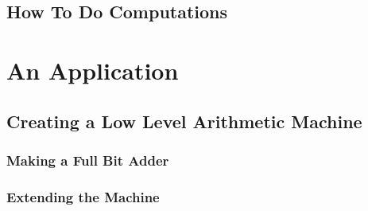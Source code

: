 \documentclass[UTF8]{article}
\begin{document}
    \subsection{How To Do Computations}

  \newpage

  \section{An Application}
    \subsection{Creating a Low Level Arithmetic Machine}
      \subsubsection{Making a Full Bit Adder}

      \subsubsection{Extending the Machine}
\end{document}
